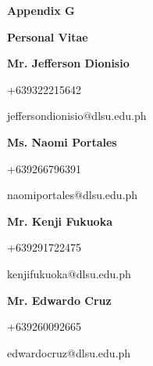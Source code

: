%
%
%                 

\textbf{\Huge Appendix G}
\bigskip

\textbf{\LARGE Personal Vitae}

\bigskip
\textbf{Mr. Jefferson Dionisio}

+639322215642

jefferson\textunderscore dionisio$@$dlsu.edu.ph

\bigskip
\textbf{Ms. Naomi Portales}

+639266796391

naomi\textunderscore portales$@$dlsu.edu.ph

\bigskip
\textbf{Mr. Kenji Fukuoka}

+639291722475

kenji\textunderscore fukuoka$@$dlsu.edu.ph

\bigskip
\textbf{Mr. Edwardo Cruz}

+639260092665

edwardo\textunderscore cruz$@$dlsu.edu.ph